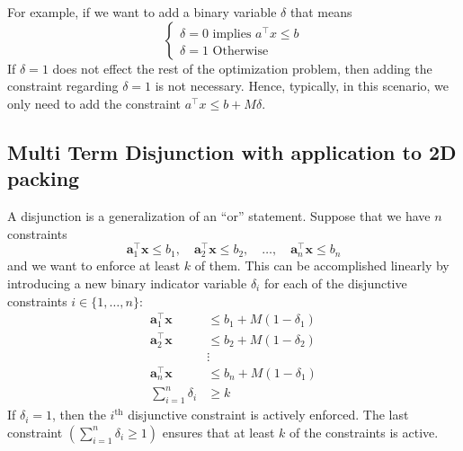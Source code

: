 For example, if we want to add a binary variable $\delta$ that means
$$
\begin{cases}
\delta = 0 \text{ implies }  a^\top x \leq b\\
\delta = 1  \text{ Otherwise}
\end{cases}
$$
If $\delta = 1$ does not effect the rest of the optimization problem, then adding the constraint regarding $\delta = 1$ is not necessary.  Hence, typically, in this scenario, we only need to add the constraint $a^\top x \leq b + M \delta$.

\subsection{Multi Term Disjunction with application to 2D packing}

A disjunction is a generalization of an ``or'' statement. Suppose that we have $n$ constraints 
	$$
	\mathbf{a}_1^\top\mathbf{x} \leq b_1, \quad \mathbf{a}_2^\top\mathbf{x} \leq b_2, \quad\dots, \quad \mathbf{a}_n^\top\mathbf{x} \leq b_n
	$$
and we want to enforce at least $k$ of them. This can be accomplished linearly by introducing a new binary indicator variable $\delta_i$ for each of the disjunctive constraints $i \in \{1,\dots,n\}$:
	\begin{align*}
	\mathbf{a}_1^\top\mathbf{x} &\leq b_1+M(1-\delta_1) \\
	\mathbf{a}_2^\top\mathbf{x} &\leq b_2+M(1-\delta_2) \\
								&\vdots 				\\
	\mathbf{a}_n^\top\mathbf{x} &\leq b_n+M(1-\delta_1) \\
	\sum_{i=1}^n\delta_i &\geq k
	\end{align*}
If $\delta_i = 1$, then the $i^\text{th}$ disjunctive constraint is actively enforced. The last constraint $\left(\sum_{i=1}^n\delta_i \geq 1\right)$ ensures that at least $k$ of the constraints is active.

